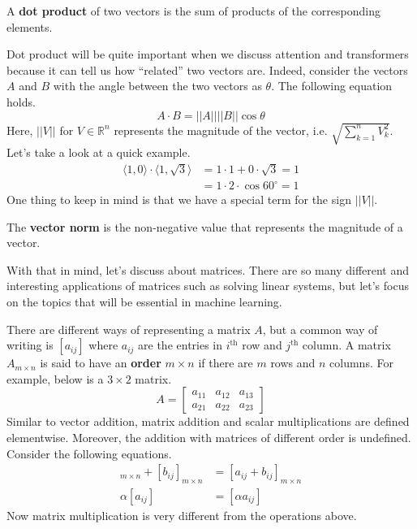 \documentclass[../main.tex]{subfiles}
\begin{document}
\begin{definition}{}{}
A \textbf{dot product} of two vectors is the sum of products of the
corresponding elements.
\end{definition}

Dot product will be quite important when we discuss attention and
transformers because it can tell us how ``related'' two vectors are.
Indeed, consider the vectors $A$ and $B$ with the angle between the
two vectors as $\theta$. The following equation holds.
\[
A \cdot B = ||A|| ||B|| \cos\theta
\]
Here, $||V||$ for $V \in \mathbb{R}^n$ represents the magnitude of the
vector, i.e. $\sqrt{\sum_{k=1}^n V_k^2}$. Let's take a look at a quick
example.
\begin{align*}
    \langle 1, 0 \rangle \cdot \langle 1, \sqrt{3} \rangle
    &= 1 \cdot 1 + 0 \cdot \sqrt{3} = 1 \\
    &= 1 \cdot 2 \cdot \cos60^\circ = 1
\end{align*}
One thing to keep in mind is that we have a special term for the
sign $||V||$.

\begin{definition}{}{}
The \textbf{vector norm} is the non-negative value that represents
the magnitude of a vector.
\end{definition}

With that in mind, let's discuss about matrices. There are so many
different and interesting applications of matrices such as solving
linear systems, but let's focus on the topics that will be essential
in machine learning.

There are different ways of representing a matrix $A$, but a common
way of writing is $[a_{ij}]$ where $a_{ij}$ are the entries in
$i^\text{th}$ row and $j^\text{th}$ column. A matrix $A_{m \times n}$
is said to have an \textbf{order} $m \times n$ if there are $m$ rows
and $n$ columns. For example, below is a $3 \times 2$ matrix.
\[
A =
\begin{bmatrix}
    a_{11} & a_{12} & a_{13} \\
    a_{21} & a_{22} & a_{23}
\end{bmatrix}
\]
Similar to vector addition, matrix addition and scalar multiplications
are defined elementwise. Moreover, the addition with matrices of
different order is undefined. Consider the following equations.
\begin{align*}
    [a_{ij}]_{m \times n} + [b_{ij}]_{m \times n}
    &= [a_{ij} + b_{ij}]_{m \times n} \\
    \alpha [a_{ij}]
    &= [\alpha a_{ij}]
\end{align*}
Now matrix multiplication is very different from the operations
above.
\end{document}
